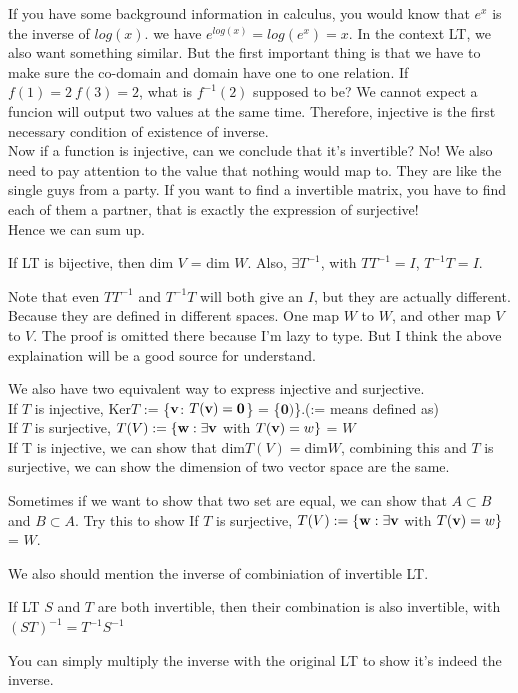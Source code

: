 If you have some background information in calculus, you would know that $e^x$ is the inverse of $log(x)$. we have $e^{log(x)} = log(e^{x}) = x$. In the context LT, we also want something similar. But the first important thing is that we have to make sure the co-domain and domain have one to one relation. If $f(1) = 2\ f(3) = 2$, what is $f^{-1}(2)$ supposed to be? We cannot expect a funcion will output two values at the same time. Therefore, injective is the first necessary condition of existence of inverse.\\

Now if a function is injective, can we conclude that it's invertible? No! We also need to pay attention to the value that nothing would map to. They are like the single guys from a party. If you want to find a invertible matrix, you have to find each of them a partner, that is exactly the expression of surjective!\\

Hence we can sum up.
\begin{theorem}
    If LT is bijective, then dim $V$ = dim $W$. Also, $\exists T^{-1}$, with $TT^{-1} = I$, $T^{-1}T = I$. 
\end{theorem}
Note that even $TT^{-1}$ and $T^{-1}T$ will both give an $I$, but they are actually different. Because they are defined in different spaces. One map $W$ to $W$, and other map $V$ to $V$. The proof is omitted there because I'm lazy to type. But I think the above explaination will be a good source for understand. 
\begin{note}
    We also have two equivalent way to express injective and surjective. \\
    If $T$ is injective, Ker$T$ := \{$\mathbf{v}$: $T(\mathbf{v}) = \mathbf{0}$\} = \{$\mathbf{0})$\}.(:= means defined as)\\
    If $T$ is surjective, $T(V):=\{\mathbf{w}: \exists \mathbf{v}$ with $T(\mathbf{v}) = w\}$ = $W$\\
    If T is injective, we can show that dim$T(V) = $dim$W$, combining this and $T$ is surjective, we can show the dimension of two vector space are the same.
\end{note}
Sometimes if we want to show that two set are equal, we can show that $A \subset B$ and $B\subset A$. Try this to show If $T$ is surjective, $T(V):=\{\mathbf{w}: \exists \mathbf{v}$ with $T(\mathbf{v}) = w\}$ = $W$.

We also should mention the inverse of combiniation of invertible LT.
\begin{theorem}
    If LT $S$ and $T$ are both invertible, then their combination is also invertible, with $(ST)^{-1} = T^{-1}S^{-1}$
\end{theorem}
You can simply multiply the inverse with the original LT to show it's indeed the inverse.


